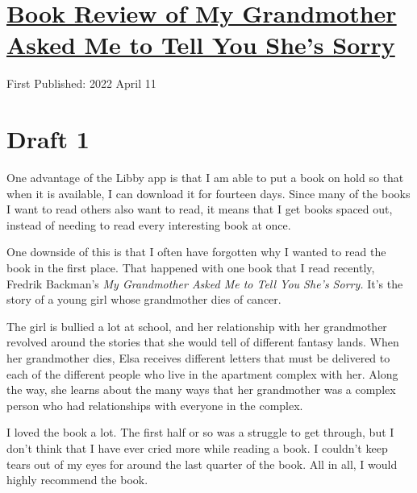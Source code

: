 \documentclass[12pt]{article}[titlepage]
\newcommand{\1}{\={a}}
\newcommand{\2}{\={e}}
\newcommand{\3}{\={\i}}
\newcommand{\4}{\=o}
\newcommand{\5}{\=u}
\newcommand{\6}{\={A}}
\renewcommand{\,}{\textsuperscript{,}}
\begin{document}
\doublespacing
\section{\href{book-review-grandmother-sorry.html}{Book Review of My Grandmother Asked Me to Tell You She's Sorry}}
First Published: 2022 April 11
\section{Draft 1}
One advantage of the Libby app is that I am able to put a book on hold so that when it is available, I can download it for fourteen days.
Since many of the books I want to read others also want to read, it means that I get books spaced out, instead of needing to read every interesting book at once.

One downside of this is that I often have forgotten why I wanted to read the book in the first place.
That happened with one book that I read recently, Fredrik Backman's \textit{My Grandmother Asked Me to Tell You She's Sorry.}
It's the story of a young girl whose grandmother dies of cancer.

The girl is bullied a lot at school, and her relationship with her grandmother revolved around the stories that she would tell of different fantasy lands.
When her grandmother dies, Elsa receives different letters that must be delivered to each of the different people who live in the apartment complex with her.
Along the way, she learns about the many ways that her grandmother was a complex person who had relationships with everyone in the complex.

I loved the book a lot.
The first half or so was a struggle to get through, but I don't think that I have ever cried more while reading a book.
I couldn't keep tears out of my eyes for around the last quarter of the book.
All in all, I would highly recommend the book.
\end{document}
